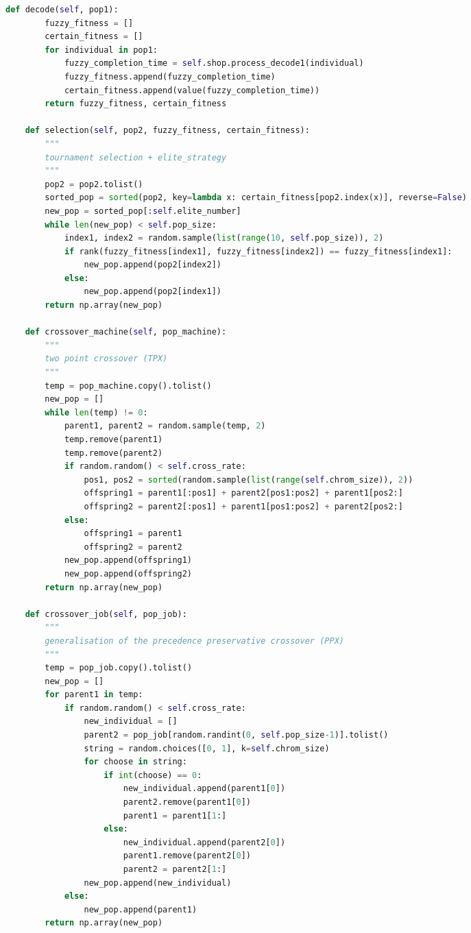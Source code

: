 \documentclass{whutmod}
\begin{document}
\begin{spacing}{1.2}
\begin{lstlisting}[language=python]
    def decode(self, pop1):
        fuzzy_fitness = []
        certain_fitness = []
        for individual in pop1:
            fuzzy_completion_time = self.shop.process_decode1(individual)
            fuzzy_fitness.append(fuzzy_completion_time)
            certain_fitness.append(value(fuzzy_completion_time))
        return fuzzy_fitness, certain_fitness

    def selection(self, pop2, fuzzy_fitness, certain_fitness):
        """
        tournament selection + elite_strategy
        """
        pop2 = pop2.tolist()
        sorted_pop = sorted(pop2, key=lambda x: certain_fitness[pop2.index(x)], reverse=False)
        new_pop = sorted_pop[:self.elite_number]
        while len(new_pop) < self.pop_size:
            index1, index2 = random.sample(list(range(10, self.pop_size)), 2)
            if rank(fuzzy_fitness[index1], fuzzy_fitness[index2]) == fuzzy_fitness[index1]:
                new_pop.append(pop2[index2])
            else:
                new_pop.append(pop2[index1])
        return np.array(new_pop)

    def crossover_machine(self, pop_machine):
        """
        two point crossover (TPX)
        """
        temp = pop_machine.copy().tolist()
        new_pop = []
        while len(temp) != 0:
            parent1, parent2 = random.sample(temp, 2)
            temp.remove(parent1)
            temp.remove(parent2)
            if random.random() < self.cross_rate:
                pos1, pos2 = sorted(random.sample(list(range(self.chrom_size)), 2))
                offspring1 = parent1[:pos1] + parent2[pos1:pos2] + parent1[pos2:]
                offspring2 = parent2[:pos1] + parent1[pos1:pos2] + parent2[pos2:]
            else:
                offspring1 = parent1
                offspring2 = parent2
            new_pop.append(offspring1)
            new_pop.append(offspring2)
        return np.array(new_pop)

    def crossover_job(self, pop_job):
        """
        generalisation of the precedence preservative crossover (PPX)
        """
        temp = pop_job.copy().tolist()
        new_pop = []
        for parent1 in temp:
            if random.random() < self.cross_rate:
                new_individual = []
                parent2 = pop_job[random.randint(0, self.pop_size-1)].tolist()
                string = random.choices([0, 1], k=self.chrom_size)
                for choose in string:
                    if int(choose) == 0:
                        new_individual.append(parent1[0])
                        parent2.remove(parent1[0])
                        parent1 = parent1[1:]
                    else:
                        new_individual.append(parent2[0])
                        parent1.remove(parent2[0])
                        parent2 = parent2[1:]
                new_pop.append(new_individual)
            else:
                new_pop.append(parent1)
        return np.array(new_pop)


\end{lstlisting}
\end{spacing}
\end{document}
